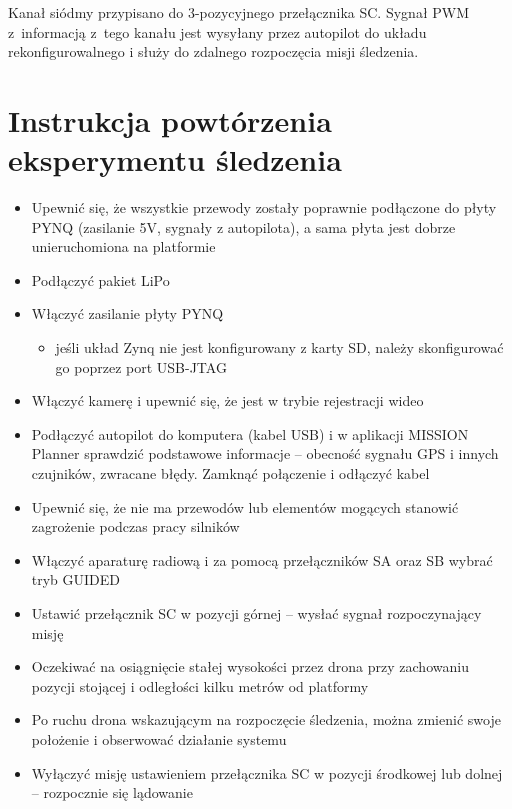 Kanał siódmy przypisano do 3-pozycyjnego przełącznika SC. Sygnał PWM z~informacją z~tego kanału jest wysyłany przez autopilot do układu rekonfigurowalnego i służy do zdalnego rozpoczęcia misji śledzenia.


\section{Instrukcja powtórzenia eksperymentu śledzenia}

\begin{itemize}
	\item Upewnić się, że wszystkie przewody zostały poprawnie podłączone do płyty PYNQ (zasilanie 5V, sygnały z autopilota), a sama płyta jest dobrze unieruchomiona na platformie
	\item Podłączyć pakiet LiPo
	\item Włączyć zasilanie płyty PYNQ
	\begin{itemize}
		\item jeśli układ Zynq nie jest konfigurowany z karty SD, należy skonfigurować go poprzez port USB-JTAG
	\end{itemize}	
	\item Włączyć kamerę i upewnić się, że jest w trybie rejestracji wideo
	\item Podłączyć autopilot do komputera (kabel USB) i w aplikacji MISSION Planner sprawdzić podstawowe informacje -- obecność sygnału GPS i innych czujników, zwracane błędy. Zamknąć połączenie i odłączyć kabel
	\item Upewnić się, że nie ma przewodów lub elementów mogących stanowić zagrożenie podczas pracy silników
	\item Włączyć aparaturę radiową i za pomocą przełączników SA oraz SB wybrać tryb GUIDED
	\item Ustawić przełącznik SC w pozycji górnej -- wysłać sygnał rozpoczynający misję 
	\item Oczekiwać na osiągnięcie stałej wysokości przez drona przy zachowaniu pozycji stojącej i odległości kilku metrów od platformy
	\item Po ruchu drona wskazującym na rozpoczęcie śledzenia, można zmienić swoje położenie i obserwować działanie systemu 
	\item Wyłączyć misję ustawieniem przełącznika SC w pozycji środkowej lub dolnej -- rozpocznie się lądowanie 
\end{itemize}